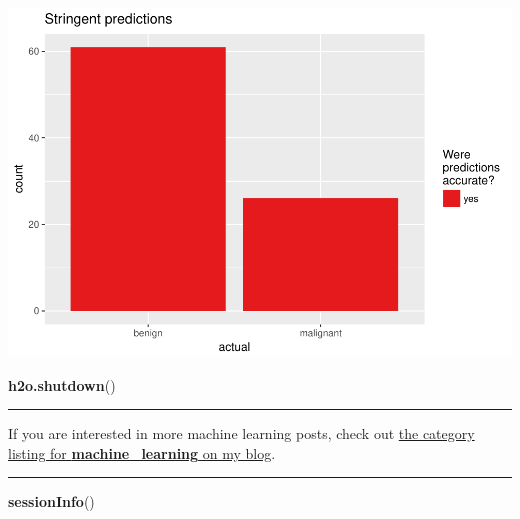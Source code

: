 \documentclass[]{article}
\newenvironment{Shaded}{\begin{snugshade}}{\end{snugshade}}
\newcommand{\KeywordTok}[1]{\textcolor[rgb]{0.13,0.29,0.53}{\textbf{{#1}}}}
\newcommand{\NormalTok}[1]{{#1}}
\begin{document}
\includegraphics{webinar_code_files/figure-latex/unnamed-chunk-53-2.pdf}

\begin{Shaded}
\begin{Highlighting}[]
\KeywordTok{h2o.shutdown}\NormalTok{()}
\end{Highlighting}
\end{Shaded}

\begin{center}\rule{0.5\linewidth}{\linethickness}\end{center}

If you are interested in more machine learning posts, check out
\href{https://shiring.github.io/categories.html\#machine_learning-ref}{the
category listing for \textbf{machine\_learning} on my blog}.

\begin{center}\rule{0.5\linewidth}{\linethickness}\end{center}

\begin{Shaded}
\begin{Highlighting}[]
\KeywordTok{sessionInfo}\NormalTok{()}
\end{Highlighting}
\end{Shaded}
\end{document}
